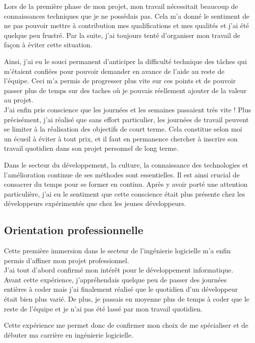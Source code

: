 \documentclass[11pt, oneside, titlepage, a4paper]{article}
\begin{document}
Lors de la première phase de mon projet, mon travail nécessitait beaucoup de connaissances techniques que je ne possédais pas. Cela m'a donné le sentiment de ne pas pouvoir mettre à contribution mes qualifications et mes qualités et j'ai été quelque peu frustré. Par la suite, j'ai toujours tenté d'organiser mon travail de façon à éviter cette situation.

Ainsi, j'ai eu le souci permanent d'anticiper la difficulté technique des tâches qui m'étaient confiées pour pouvoir demander en avance de l'aide au reste de l'équipe. Ceci m'a permis de progresser plus vite sur ces points et de pouvoir passer plus de temps sur des taches où je pouvais réellement ajouter de la valeur au projet.
\\

J'ai enfin pris conscience que les journées et les semaines passaient très vite ! Plus précisément, j'ai réalisé que sans effort particulier, les journées de travail peuvent se limiter à la réalisation des objectifs de court terme. Cela constitue selon moi un écueil à éviter à tout prix, et il faut en permanence chercher à inscrire son travail quotidien dans son projet personnel de long terme.

Dans le secteur du développement, la culture, la connaissance des technologies et l'amélioration continue de ses méthodes sont essentielles. Il est ainsi crucial de consacrer du temps pour se former en continu. Après y avoir porté une attention particulière, j'ai eu le sentiment que cette \og conscience \fg{} était plus présente chez les développeurs expérimentés que chez les jeunes développeurs.
	\subsection{Orientation professionnelle}
Cette première immersion dans le secteur de l'ingénierie logicielle m'a enfin permis d'affiner mon projet professionnel.
\\

J'ai tout d'abord confirmé mon intérêt pour le développement informatique. Avant cette expérience, j'appréhendais quelque peu de passer des journées entières à coder mais j'ai finalement réalisé que le quotidien d'un développeur était bien plus varié. De plus, je passais en moyenne plus de temps à coder que le reste de l'équipe et je n'ai pas été \og lassé \fg{} par mon travail quotidien.

Cette expérience me permet donc de confirmer mon choix de me spécialiser et de débuter ma carrière en ingénierie logicielle.
\\
\end{document}
